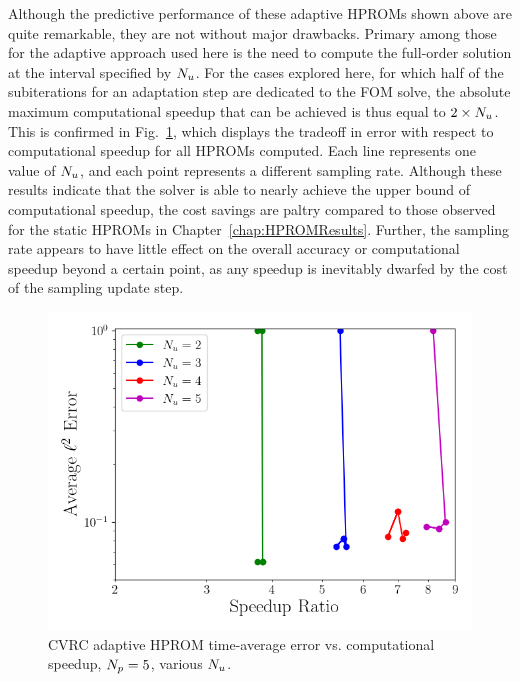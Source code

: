 Although the predictive performance of these adaptive HPROMs shown above are quite remarkable, they are not without major drawbacks. Primary among those for the adaptive approach used here is the need to compute the full-order solution at the interval specified by $N_u$. For the cases explored here, for which half of the subiterations for an adaptation step are dedicated to the FOM solve, the absolute maximum computational speedup that can be achieved is thus equal to $2 \times N_u$. This is confirmed in Fig.~\ref{fig:cvrcAdaptivePareto}, which displays the tradeoff in error with respect to computational speedup for all HPROMs computed. Each line represents one value of $N_u$, and each point represents a different sampling rate. Although these results indicate that the solver is able to nearly achieve the upper bound of computational speedup, the cost savings are paltry compared to those observed for the static HPROMs in Chapter~\ref{chap:HPROMResults}. Further, the sampling rate appears to have little effect on the overall accuracy or computational speedup beyond a certain point, as any speedup is inevitably dwarfed by the cost of the sampling update step.

\begin{figure}
    \centering
    \includegraphics[width=0.5\linewidth]{Chapters/AdaptiveResults/Images/cvrc/pareto_wrt_iters_Average_errorRaw_pareto.png}
    \caption{\label{fig:cvrcAdaptivePareto}CVRC adaptive HPROM time-average error vs. computational speedup, $N_p = 5$, various $N_u$.}
\end{figure}
